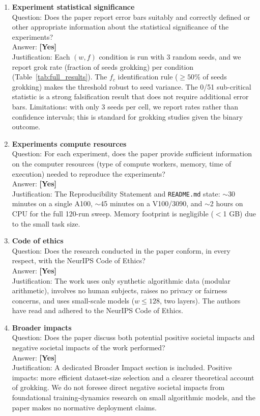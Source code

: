 \documentclass{article}
\begin{document}
\begin{enumerate}
\item {\bf Experiment statistical significance}\\
Question: Does the paper report error bars suitably and correctly defined or other appropriate information about the statistical significance of the experiments?\\
Answer: \textbf{[Yes]}\\
Justification: Each $(w, f)$ condition is run with 3 random seeds, and we report grok rate (fraction of seeds grokking) per condition (Table~\ref{tab:full_results}). The $f_c$ identification rule ($\geq 50\%$ of seeds grokking) makes the threshold robust to seed variance. The 0/51 sub-critical statistic is a strong falsification result that does not require additional error bars. Limitations: with only 3 seeds per cell, we report rates rather than confidence intervals; this is standard for grokking studies given the binary outcome.

\item {\bf Experiments compute resources}\\
Question: For each experiment, does the paper provide sufficient information on the computer resources (type of compute workers, memory, time of execution) needed to reproduce the experiments?\\
Answer: \textbf{[Yes]}\\
Justification: The Reproducibility Statement and \texttt{README.md} state: $\sim$30 minutes on a single A100, $\sim$45 minutes on a V100/3090, and $\sim$2 hours on CPU for the full 120-run sweep. Memory footprint is negligible ($<$1 GB) due to the small task size.

\item {\bf Code of ethics}\\
Question: Does the research conducted in the paper conform, in every respect, with the NeurIPS Code of Ethics?\\
Answer: \textbf{[Yes]}\\
Justification: The work uses only synthetic algorithmic data (modular arithmetic), involves no human subjects, raises no privacy or fairness concerns, and uses small-scale models ($w \le 128$, two layers). The authors have read and adhered to the NeurIPS Code of Ethics.

\item {\bf Broader impacts}\\
Question: Does the paper discuss both potential positive societal impacts and negative societal impacts of the work performed?\\
Answer: \textbf{[Yes]}\\
Justification: A dedicated Broader Impact section is included. Positive impacts: more efficient dataset-size selection and a clearer theoretical account of grokking. We do not foresee direct negative societal impacts from foundational training-dynamics research on small algorithmic models, and the paper makes no normative deployment claims.


\end{enumerate}
\end{document}
